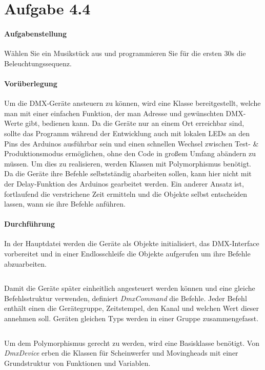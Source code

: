 \section{Aufgabe 4.4}
\paragraph{Aufgabenstellung}
Wählen Sie ein Musikstück aus und programmieren Sie für die ersten 30s die Beleuchtungssequenz.

\paragraph{Vorüberlegung}
Um die DMX-Geräte ansteuern zu können, wird eine Klasse bereitgestellt, welche man mit einer einfachen Funktion, der man Adresse und gewünschten DMX-Werte gibt, bedienen kann. Da die Geräte nur an einem Ort erreichbar sind, sollte das Programm während der Entwicklung auch mit lokalen LEDs an den Pins des Arduinos ausführbar sein und einen schnellen Wechsel zwischen Test- \& Produktionsmodus ermöglichen, ohne den Code in großem Umfang abändern zu müssen. Um dies zu realisieren, werden Klassen mit Polymorphismus benötigt. Da die Geräte ihre Befehle selbstständig abarbeiten sollen, kann hier nicht mit der Delay-Funktion des Arduinos gearbeitet werden. Ein anderer Ansatz ist, fortlaufend die verstrichene Zeit ermitteln und die Objekte selbst entscheiden lassen, wann sie ihre Befehle anführen.

\paragraph{Durchführung}
In der Hauptdatei werden die Geräte als Objekte initialisiert, das DMX-Interface vorbereitet und in einer Endlosschleife die Objekte aufgerufen um ihre Befehle abzuarbeiten.
\inputminted[linenos=true, breaklines, fontsize=\fontsize{10pt}{10pt}]{cpp}{../src/main.cpp}

Damit die Geräte später einheitlich angesteuert werden können und eine gleiche Befehlsstruktur verwenden, definiert \textit{DmxCommand} die Befehle. Jeder Befehl enthält einen die Gerätegruppe, Zeitstempel, den Kanal und welchen Wert dieser annehmen soll. Geräten gleichen Typs werden in einer Gruppe zusammengefasst.
\inputminted[linenos=true, breaklines, fontsize=\fontsize{10pt}{10pt}]{cpp}{../src/DmxCommand.h}

Um dem Polymorphismus gerecht zu werden, wird eine Basisklasse benötigt. Von \textit{DmxDevice} erben die Klassen für Scheinwerfer und Movingheads mit einer Grundstruktur von Funktionen und Variablen.
\inputminted[linenos=true, breaklines, fontsize=\fontsize{10pt}{10pt}]{cpp}{../src/DmxDevice.h}

